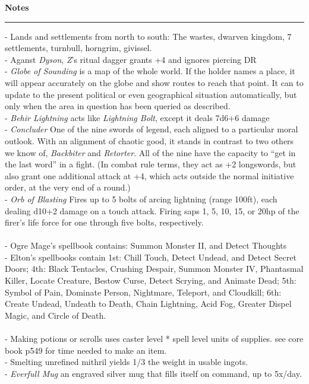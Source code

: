 \documentclass[letterpaper]{article}
\newcommand{\e}[1]{\emph{#1}}
\newcommand{\B}[1]{\textbf{#1}}
\newenvironment{notesection}[1]
{ {\huge \B{#1}}\hrule\vspace{0.5em}\begingroup\fontsize{9pt}{12pt}\selectfont}
{\endgroup}
\begin{document}
\begin{notesection}{Notes}
- Lands and settlements from north to south: The wastes, dwarven kingdom, 7 settlements, turnbull, horngrim, givissel.\\
- Aganst \e{Dyson}, \e{Z}'s ritual dagger grants +4 and ignores piercing DR\\
- \e{Globe of Sounding} is a map of the whole world. If the holder names a place, it will appear accurately on the globe and show routes to reach that point. It can to update to the present political or even geographical situation automatically, but only when the area in question has been queried as described.\\
- \e{Behir Lightning} acts like \e{Lightning Bolt}, except it deals 7d6+6 damage\\
- \e{Concluder} One of the nine swords of legend, each aligned to a particular moral outlook. With an alignment of chaotic good, it stands in contrast to two others we know of, \e{Backbiter} and \e{Retorter}. All of the nine have the capacity to ``get in the last word'' in a fight. (In combat rule terms, they act as +2 longswords, but also grant one additional attack at +4, which acts outside the normal initiative order, at the very end of a round.)\\
- \e{Orb of Blasting} Fires up to 5 bolts of arcing lightning (range 100ft), each dealing d10+2 damage on a touch attack. Firing saps 1, 5, 10, 15, or 20hp of the firer's life force for one through five bolts, respectively.\\\\
- Ogre Mage's spellbook contains: Summon Monster II, and Detect Thoughts\\
- Elton's spellbooks contain 1st: Chill Touch, Detect Undead, and Detect Secret Doors; 4th: Black Tentacles, Crushing Despair, Summon Monster IV, Phantasmal Killer, Locate Creature, Bestow Curse, Detect Scrying, and Animate Dead; 5th: Symbol of Pain, Dominate Person, Nightmare, Teleport, and Cloudkill; 6th: Create Undead, Undeath to Death, Chain Lightning, Acid Fog, Greater Dispel Magic, and Circle of Death.\\\\
- Making potions or scrolls uses caster level * spell level units of supplies. see core book p549 for time needed to make an item.\\
- Smelting unrefined mithril yields 1/3 the weight in usable ingots.\\
- \e{Everfull Mug} an engraved silver mug that fills itself on command, up to 5x/day.\\


\end{notesection}
\end{document}
